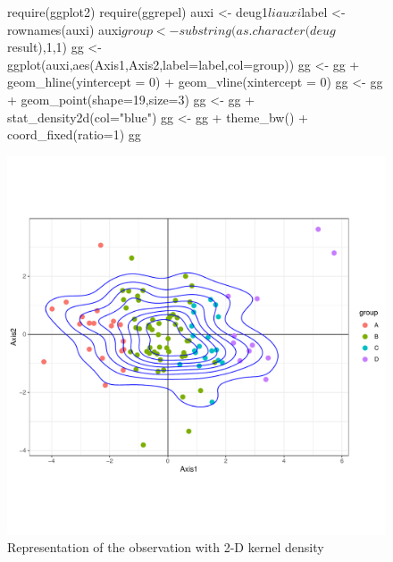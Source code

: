 \documentclass[a4paper,10pt]{article}
\begin{document}
\begin{figure}[H]
\begin{center}
\begin{Schunk}
\begin{Sinput}
  require(ggplot2)
  require(ggrepel)
  auxi <- deug1$li
  auxi$label <- rownames(auxi)
  auxi$group <- substring(as.character(deug$result),1,1)
  gg <- ggplot(auxi,aes(Axis1,Axis2,label=label,col=group))
  gg <- gg + geom_hline(yintercept = 0) + geom_vline(xintercept = 0)
  gg <- gg + geom_point(shape=19,size=3)
  gg <- gg + stat_density2d(col="blue")
  gg <-  gg + theme_bw() + coord_fixed(ratio=1)
  gg
\end{Sinput}
\end{Schunk}
\includegraphics{figs/sweave-lidensity2}
\caption{Representation of the observation with 2-D kernel density}
\label{fig:lidensity2}
\end{center}
\end{figure}
\end{document}
